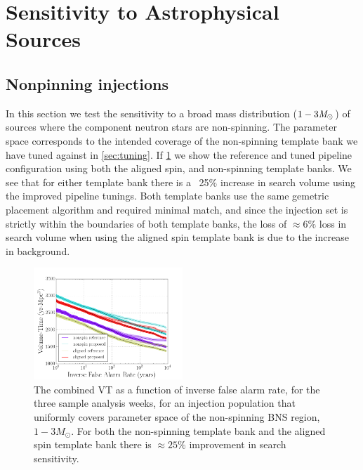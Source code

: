 
\section{Sensitivity to Astrophysical Sources}
\subsection{Nonpinning injections}

In this section we test the sensitivity to a broad mass distribution ($1-3 \mathit{M}_\odot$) of sources where the component neutron stars are non-spinning. The parameter space corresponds to the intended coverage of the non-spinning template bank we have tuned against in \ref{sec:tuning}.  If \ref{fig:nonspin} we show the reference and tuned pipeline configuration using both the aligned spin, and non-spinning template banks. We see that for either template bank there is a ~25$\%$ increase in search volume using the improved pipeline tunings. Both template banks use the same gemetric placement algorithm and required minimal match, and since the injection set is strictly within the boundaries of both template banks, the loss of $\approx 6\%$ loss in search volume when using the aligned spin template bank is due to the increase in background. 

\begin{figure}
\includegraphics[width=0.5\textwidth]{papers/bns_o1_dev/figures/ns_combined.png}
\caption{\label{fig:nonspin} 
The combined VT as a function of inverse false alarm rate, for the
three sample analysis weeks, for an injection population that uniformly covers parameter space of the non-spinning BNS region, $1- 3M_\odot$. For both the non-spinning template bank and the aligned spin template bank there is $\approx 25 \%$ improvement in search sensitivity.
}
\end{figure}

